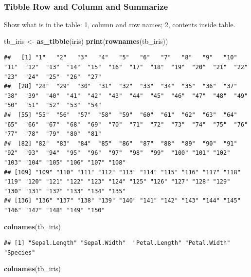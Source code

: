\documentclass[
]{book}
\newenvironment{Shaded}{\begin{snugshade}}{\end{snugshade}}
\newcommand{\KeywordTok}[1]{\textcolor[rgb]{0.13,0.29,0.53}{\textbf{#1}}}
\newcommand{\NormalTok}[1]{#1}
\newcommand{\StringTok}[1]{\textcolor[rgb]{0.31,0.60,0.02}{#1}}
\begin{document}
\hypertarget{tibble-row-and-column-and-summarize}{%
\subsubsection{Tibble Row and Column and Summarize}\label{tibble-row-and-column-and-summarize}}

Show what is in the table: 1, column and row names; 2, contents inside table.

\begin{Shaded}
\begin{Highlighting}[]
\NormalTok{tb_iris <-}\StringTok{ }\KeywordTok{as_tibble}\NormalTok{(iris)}
\KeywordTok{print}\NormalTok{(}\KeywordTok{rownames}\NormalTok{(tb_iris))}
\end{Highlighting}
\end{Shaded}

\begin{verbatim}
##   [1] "1"   "2"   "3"   "4"   "5"   "6"   "7"   "8"   "9"   "10"  "11"  "12"  "13"  "14"  "15"  "16"  "17"  "18"  "19"  "20"  "21"  "22"  "23"  "24"  "25"  "26"  "27" 
##  [28] "28"  "29"  "30"  "31"  "32"  "33"  "34"  "35"  "36"  "37"  "38"  "39"  "40"  "41"  "42"  "43"  "44"  "45"  "46"  "47"  "48"  "49"  "50"  "51"  "52"  "53"  "54" 
##  [55] "55"  "56"  "57"  "58"  "59"  "60"  "61"  "62"  "63"  "64"  "65"  "66"  "67"  "68"  "69"  "70"  "71"  "72"  "73"  "74"  "75"  "76"  "77"  "78"  "79"  "80"  "81" 
##  [82] "82"  "83"  "84"  "85"  "86"  "87"  "88"  "89"  "90"  "91"  "92"  "93"  "94"  "95"  "96"  "97"  "98"  "99"  "100" "101" "102" "103" "104" "105" "106" "107" "108"
## [109] "109" "110" "111" "112" "113" "114" "115" "116" "117" "118" "119" "120" "121" "122" "123" "124" "125" "126" "127" "128" "129" "130" "131" "132" "133" "134" "135"
## [136] "136" "137" "138" "139" "140" "141" "142" "143" "144" "145" "146" "147" "148" "149" "150"
\end{verbatim}

\begin{Shaded}
\begin{Highlighting}[]
\KeywordTok{colnames}\NormalTok{(tb_iris)}
\end{Highlighting}
\end{Shaded}

\begin{verbatim}
## [1] "Sepal.Length" "Sepal.Width"  "Petal.Length" "Petal.Width"  "Species"
\end{verbatim}

\begin{Shaded}
\begin{Highlighting}[]
\KeywordTok{colnames}\NormalTok{(tb_iris)}
\end{Highlighting}
\end{Shaded}
\end{document}
